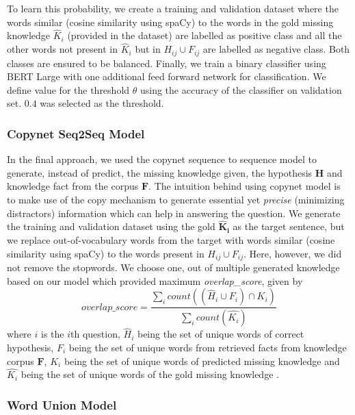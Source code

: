 \documentclass[11pt,a4paper]{article}
\begin{document}
To learn this probability, we create a training and validation dataset where the words similar (cosine similarity using spaCy) \cite{spacy2} to the words in the gold missing knowledge $\hat{K}_i$ (provided in the dataset) are labelled as positive class and all the other words not present in $\hat{K}_i$ but in $H_{ij} \cup F_{ij}$ are labelled as negative class.  Both classes are ensured to be balanced. Finally, we train a binary classifier using BERT Large with one additional feed forward network for classification. We define value for the threshold $\theta$ using the accuracy of the classifier on validation set. $0.4$ was selected as the threshold.



\subsubsection{Copynet Seq2Seq Model}
In the final approach, we used the copynet sequence to sequence model \cite{P16-1154} to generate, instead of predict, the missing knowledge given, the hypothesis $\mathbf{H}$ and knowledge fact from the corpus $\mathbf{F}$. The intuition behind using copynet model is to make use of the copy mechanism to generate essential yet \textit{precise} (minimizing distractors) information which can help in answering the question.
We generate the training and validation dataset using the gold $\mathbf{\hat{K}_i}$ as the target sentence, but we replace out-of-vocabulary words from the target with words similar (cosine similarity using spaCy) \cite{spacy2} to the words present in $H_{ij} \cup F_{ij}$. Here, however, we did not remove the stopwords.
We choose one, out of multiple generated knowledge based on our model which provided maximum \textit{overlap\_score}, given by
\begin{equation*}
overlap\_score = \frac{\sum_{i}{count ((\hat{H}_{i} \cup F_{i})\cap K_{i})}}{\sum_{i}{count(\hat{K_{i}})}}
\end{equation*}
where $i$ is the $i$th question, $\hat{H}_{i}$ being the set of unique words of correct hypothesis, $F_{i}$ being the set of unique words from retrieved facts from knowledge corpus $\mathbf{F}$, $K_{i}$ being the set of unique words of predicted missing knowledge and $\hat{K_i}$ being the set of unique words of the gold missing knowledge .



\subsubsection{Word Union Model}
\end{document}
